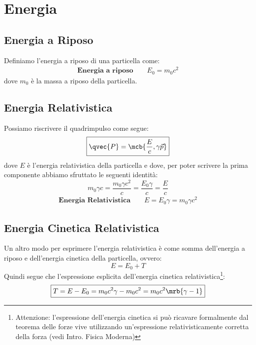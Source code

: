 \section{Energia}
\subsection{Energia a Riposo}
Definiamo l'energia a riposo di una particella come:
\begin{align}
  \textbf{Energia a riposo} \qquad \boxed{E_0 = m_0c^2}
\end{align}
dove $m_0$ è la massa a riposo della particella.

\subsection{Energia Relativistica}
Possiamo riscrivere il quadrimpulso come segue:
\begin{equation}
  \boxed{
    \qvec{P} = \mcb{\frac{E}{c}, \gamma\vec{p}}
  }
\end{equation}
dove $E$ è l'energia relativistica della particella e dove, per poter scrivere
la prima componente abbiamo sfruttato le seguenti identità:
\begin{equation}
  m_0 \gamma c = \frac{m_0 \gamma c^2}{c} = \frac{E_0\gamma}{c} = \frac{E}{c}
\end{equation}
\begin{align}
  \textbf{Energia Relativistica} \qquad \boxed{E = E_0\gamma = m_0 \gamma c^2}
\end{align}

\subsection{Energia Cinetica Relativistica}
Un altro modo per esprimere l'energia relativistica è come somma dell'energia a
riposo e dell'energia cinetica della particella, ovvero:
\begin{equation}
  E = E_0 + T
\end{equation}
Quindi segue che l'espressione esplicita dell'energia cinetica
relativistica\footnote{
  Attenzione: l'espressione dell'energia cinetica si può ricavare formalmente
  dal teorema delle forze vive utilizzando un'espressione relativisticamente
  corretta della forza (vedi Intro. Fisica Moderna)
}:
\begin{equation}
  \boxed{T = E - E_0 = m_0c^2\gamma - m_0c^2 = m_0c^2\mrb{\gamma - 1}}
\end{equation}


